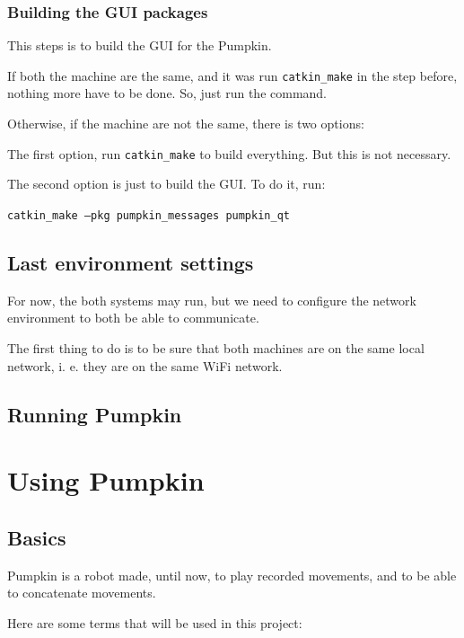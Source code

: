 \documentclass[oneside,a4paper,titlepage]{article}
\begin{document}
\subsubsection{Building the GUI packages}

This steps is to build the GUI for the Pumpkin.

If both the machine are the same, and it was run \texttt{catkin\_make} in the step before, nothing more have to be done. So, just run the command.

Otherwise, if the machine are not the same, there is two options:

The first option, run \texttt{catkin\_make} to build everything. But this is not necessary.

The second option is just to build the GUI. To do it, run:

\begin{center}
\texttt{catkin\_make --pkg pumpkin\_messages pumpkin\_qt}
\end{center}

\subsection{Last environment settings}

For now, the both systems may run, but we need to configure the network environment to both be able to communicate.

The first thing to do is to be sure that both machines are on the same local network, i. e. they are on the same WiFi network.

\subsection{Running Pumpkin}


\section{Using Pumpkin}

\subsection{Basics}

Pumpkin is a robot made, until now, to play recorded movements, and to be able to concatenate movements.

Here are some terms that will be used in this project:
\end{document}
